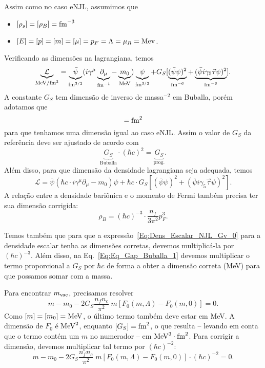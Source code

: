 Assim como no caso eNJL, assumimos que
\begin{itemize}
	\item $[\rho_s] = [\rho_B] = \rm{fm}^{-3}$
	\item $[E] = [p] = [m] = [\mu] = p_F = \Lambda = \mu_R = \rm{Mev}$.
\end{itemize}
%
Verificando as dimensões na lagrangiana, temos
\begin{equation}
	\underbrace{\mathcal{L}}_{\mathcal{\rm{MeV}/\rm{fm}^3}} = \underbrace{\bar{\psi}}_{\rm{fm}^{3/2}}(i\gamma^\mu\underbrace{\partial_\mu}_{\rm{fm}^{-1}} - \underbrace{m_0}_{\rm{MeV}})\underbrace{\psi}_{\rm{fm}^{3/2}} + G_S [ \underbrace{(\bar{\psi}\psi)^2}_{\rm{fm}^{-6}} + \underbrace{(\bar{\psi}i\gamma_5\vec{\tau}\psi)^2}_{\rm{fm}^{-6}}].
\end{equation}
%
A constante $G_S$ tem dimensão de inverso de massa$^{-2}$ em Buballa\cite{Buballa1996}, porém adotamos que 
\begin{equation}
	[G_S] = \rm{fm}^{2}
\end{equation}
%
para que tenhamos uma dimensão igual ao caso eNJL. Assim o valor de $G_S$ da referência deve ser ajustado de acordo com
\begin{equation}
	\underbrace{G_S}_{\textrm{Buballa}} \cdot (\hbar c)^2 = \underbrace{G_S}_{\textrm{prog.}}.
\end{equation}
%
Além disso, para que dimensão da densidade lagrangiana seja adequada, temos
\begin{equation}
	\mathcal{L} = \bar{\psi}(\hbar c \cdot i\gamma^\mu\partial_\mu - m_0)\psi + \hbar c \cdot G_S[(\bar{\psi}\psi)^2 + (\bar{\psi}i\gamma_5\vec{\tau}\psi)^2].
\end{equation}
%
A relação entre a densidade bariônica e o momento de Fermi também precisa ter sua dimensão corrigida:
\begin{equation}
	\rho_B = (\hbar c)^{-3} \cdot \frac{n_f}{3\pi^2}p_F^3.
\end{equation}

Temos também que para que a expressão~\eqref{Eq:Dens_Escalar_NJL_Gv_0} para a densidade escalar tenha as dimensões corretas, devemos multiplicá-la por $(\hbar c)^{-3}$. Além disso, na Eq.~\eqref{Eq:Eq_Gap_Buballa_1} devemos multiplicar o termo proporcional a $G_S$ por $\hbar c$ de forma a obter a dimensão correta (MeV) para que possamos somar com a massa.

Para encontrar $m_{\rm{vac}}$, precisamos resolver
\begin{equation}
	m - m_0 - 2G_S\frac{n_f n_c}{\pi^2} \;m [F_0(m, \Lambda) - F_0(m,0)] = 0.
\end{equation}
%
Como $[m] = [m_0] = \rm{MeV}$, o último termo também deve estar em MeV. A dimensão de $F_0$ é $\rm{MeV}^2$, enquanto $[G_S] = \rm{fm}^2$, o que resulta -- levando em conta que o termo contém um $m$ no numerador -- em $\rm{MeV}^3\cdot\rm{fm}^2$. Para corrigir a dimensão, devemos multiplicar tal termo por $(\hbar c)^{-2}$:
\begin{equation}
	m - m_0 - 2G_S\frac{n_f n_c}{\pi^2} \;m [F_0(m, \Lambda) - F_0(m,0)] \cdot (\hbar c)^{-2} = 0.
\end{equation}

